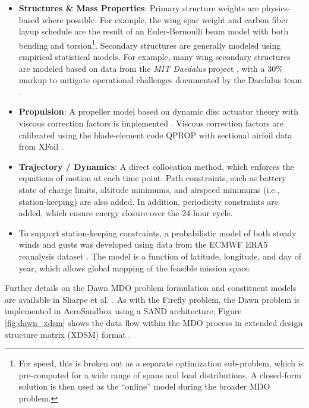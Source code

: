 \begin{example}
\begin{itemize}
\begin{itemize}
            \item \textbf{Structures \& Mass Properties}: Primary structure weights are physics-based where possible. For example, the wing spar weight and carbon fiber layup schedule are the result of an Euler-Bernoulli beam model with both bending and torsion\footnote{For speed, this is broken out as a separate optimization sub-problem, which is pre-computed for a wide range of spans and load distributions. A closed-form solution is then used as the ``online'' model during the broader MDO problem.}. Secondary structures are generally modeled using empirical statistical models. For example, many wing secondary structures are modeled based on data from the \emph{MIT Daedalus} project \cite{cruz_weight_1989, cruz_structural_1989, langford_feasibility_1986}, with a 30\% markup to mitigate operational challenges documented by the Daedalus team \cite{langford_daedalus_1989}.

            \item \textbf{Propulsion}: A propeller model based on dynamic disc actuator theory with viscous correction factors is implemented \cite{unified_propellers}. Viscous correction factors are calibrated using the blade-element code QPROP with sectional airfoil data from XFoil \cite{drela_xfoil_1989, qprop}.

            \item \textbf{Trajectory / Dynamics}: A direct collocation method, which enforces the equations of motion at each time point. Path constraints, such as battery state of charge limits, altitude minimums, and airspeed minimums (i.e., station-keeping) are also added. In addition, periodicity constraints are added, which ensure energy closure over the 24-hour cycle.

            \item To support station-keeping constraints, a probabilistic model of both steady winds and gusts was developed using data from the ECMWF ERA5 reanalysis dataset \cite{era5}. The model is a function of latitude, longitude, and day of year, which allows global mapping of the feasible mission space.

        \end{itemize}

    \end{itemize}

\end{example}

Further details on the Dawn MDO problem formulation and constituent models are available in Sharpe et al. \cite{sharpe_optimization_2021}. As with the Firefly problem, the Dawn problem is implemented in AeroSandbox using a SAND architecture; Figure \ref{fig:dawn_xdsm} shows the data flow within the MDO process in extended design structure matrix (XDSM) format \cite{xdsm}.

